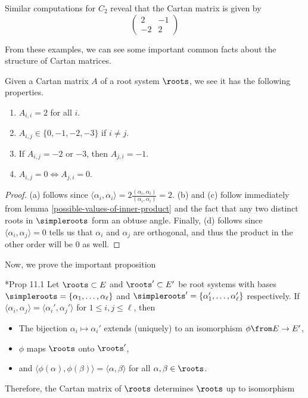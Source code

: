\documentclass[11pt,leqno,oneside]{amsart}
\numberwithin{thm}{section}
\begin{document}
\begin{example}
  Similar computations for \(C_2\) reveal that the Cartan matrix is
  given by \[
    \left(
      \begin{array}{cc}
        2&-1\\
        -2&2
      \end{array}
\right)
\]
\end{example}
From these examples, we can see some important common facts about the
structure of Cartan matrices.
\begin{prop}
  Given a Cartan matrix \(A\) of a root system \(\roots\), we see it
  has the following properties.
  \begin{enumerate}
  \item \(A_{i,i} = 2\) for all \(i\).
  \item \(A_{i,j} \in \{0,-1,-2,-3\}\) if \(i \neq j\).
  \item If \(A_{i,j} = -2\) or \(-3\), then \(A_{j,i} = -1\).
  \item \(A_{i,j} = 0 \iff A_{j,i} = 0\).
  \end{enumerate}
\end{prop}
\begin{proof}
  (a) follows since \(\langle \alpha_i, \alpha_i \rangle = 2
  \frac{(\alpha_i, \alpha_i)}{(\alpha_i, \alpha_i)} = 2\). (b) and (c)
  follow immediately
  from lemma \ref{possible-values-of-inner-product} and the fact that
  any two distinct roots in 
  \(\simpleroots\) form an obtuse angle. Finally, (d) follows since
  \(\langle \alpha_i, \alpha_j \rangle = 0\) tells us that
  \(\alpha_i\) and \(\alpha_j\) are orthogonal, and thus the product
  in the other order will be \(0\) as well.
\end{proof}
Now, we prove the important proposition
\begin{prop}
  \cite{humph}*{Prop 11.1} Let \(\roots \subset E\) and \(\roots'
  \subset E'\) be root systems 
  with bases \(\simpleroots = \{\alpha_1, \ldots, \alpha_\ell\}\) and
  \(\simpleroots' = \{\alpha_1', \ldots, \alpha_\ell'\}\)
  respectively. If \(\langle \alpha_i, \alpha_j \rangle = \langle
  \alpha_i', \alpha_j' \rangle\) for \(1 \leq i,j \leq \ell\), then
  \begin{itemize}
  \item  The bijection \(\alpha_i \mapsto \alpha_i'\) extends (uniquely) to
    an isomorphism \(\phi \from E \to E'\),
  \item \(\phi\) maps \(\roots\) onto \(\roots'\),
  \item and \(\langle \phi(\alpha), \phi(\beta) \rangle = \langle
    \alpha, \beta \rangle\) for all \(\alpha,\beta \in \roots\).
  \end{itemize}
  Therefore, the Cartan matrix of \(\roots\) determines \(\roots\) up
  to isomorphism
\end{prop}
\end{document}
